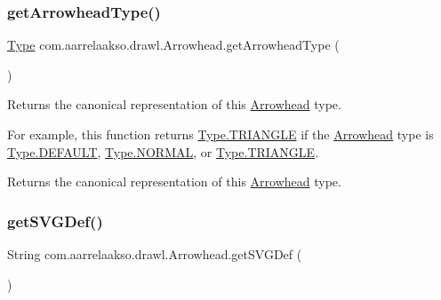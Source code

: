 \subsubsection{\texorpdfstring{get\+Arrowhead\+Type()}{getArrowheadType()}}
{\footnotesize\ttfamily \hyperlink{enumcom_1_1aarrelaakso_1_1drawl_1_1_arrowhead_1_1_type}{Type} com.\+aarrelaakso.\+drawl.\+Arrowhead.\+get\+Arrowhead\+Type (\begin{DoxyParamCaption}{ }\end{DoxyParamCaption})\hspace{0.3cm}{\ttfamily [protected]}}



Returns the canonical representation of this \hyperlink{classcom_1_1aarrelaakso_1_1drawl_1_1_arrowhead}{Arrowhead} type. 

For example, this function returns \hyperlink{enumcom_1_1aarrelaakso_1_1drawl_1_1_arrowhead_1_1_type_a84bfc9a808825452b04017d73f63f99e}{Type.\+T\+R\+I\+A\+N\+G\+LE} if the \hyperlink{classcom_1_1aarrelaakso_1_1drawl_1_1_arrowhead}{Arrowhead} type is \hyperlink{enumcom_1_1aarrelaakso_1_1drawl_1_1_arrowhead_1_1_type_ae4c70d3cd0853637fba791f2bb29cd8e}{Type.\+D\+E\+F\+A\+U\+LT}, \hyperlink{enumcom_1_1aarrelaakso_1_1drawl_1_1_arrowhead_1_1_type_abd0879a22002109b53e3d6af939c0734}{Type.\+N\+O\+R\+M\+AL}, or \hyperlink{enumcom_1_1aarrelaakso_1_1drawl_1_1_arrowhead_1_1_type_a84bfc9a808825452b04017d73f63f99e}{Type.\+T\+R\+I\+A\+N\+G\+LE}.

\begin{DoxyReturn}{Returns}
the canonical representation of this \hyperlink{classcom_1_1aarrelaakso_1_1drawl_1_1_arrowhead}{Arrowhead} type. 
\end{DoxyReturn}
\mbox{\label{classcom_1_1aarrelaakso_1_1drawl_1_1_arrowhead_a0094c4f48945d782b7e474b15ef06561}} 
\subsubsection{\texorpdfstring{get\+S\+V\+G\+Def()}{getSVGDef()}}
{\footnotesize\ttfamily String com.\+aarrelaakso.\+drawl.\+Arrowhead.\+get\+S\+V\+G\+Def (\begin{DoxyParamCaption}{ }\end{DoxyParamCaption})\hspace{0.3cm}{\ttfamily [protected]}}



